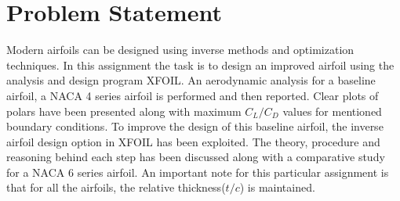 \documentclass[main.tex]{subfiles}
\begin{document}
\section{Problem Statement}
Modern airfoils can be designed using inverse methods and optimization techniques. In this assignment the task is to design an improved airfoil using the analysis and design program XFOIL. An aerodynamic analysis for a baseline airfoil, a NACA 4 series airfoil is performed and then reported. Clear plots of polars have been presented along with maximum $C_L/C_D$ values for mentioned boundary conditions. To improve the design of this baseline airfoil, the inverse airfoil design option in XFOIL has been exploited. The theory, procedure and reasoning behind each step has been discussed along with a comparative study for a NACA 6 series airfoil. An important note for this particular assignment is that for all the airfoils, the relative thickness($t/c$) is maintained.  
\end{document}
